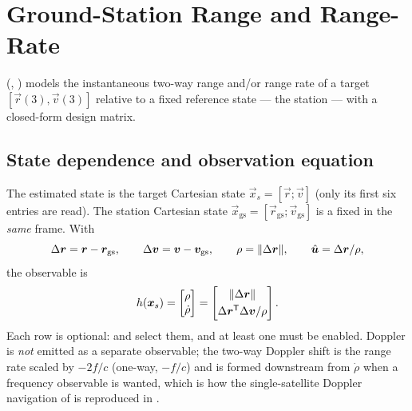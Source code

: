 \section{Ground-Station Range and Range-Rate}
\label{sec:meas-groundrange}

(,
) models the
instantaneous two-way range and/or range rate of a target
$[\vec{r}(3), \vec{v}(3)]$ relative to a fixed reference state --- the station
--- with a closed-form design matrix.

\subsection{State dependence and observation equation}

The estimated state is the target Cartesian state
$\vec{x}_s = [\vec{r}; \vec{v}]$ (only its first six entries are read). The
station Cartesian state
$\vec{x}_\mathrm{gs} = [\vec{r}_\mathrm{gs}; \vec{v}_\mathrm{gs}]$ is a fixed
 in the \emph{same} frame. With
\begin{equation}
  \Delta\bm{r} = \bm{r} - \bm{r}_\mathrm{gs}, \qquad
  \Delta\bm{v} = \bm{v} - \bm{v}_\mathrm{gs}, \qquad
  \rho = \lVert\Delta\bm{r}\rVert, \qquad
  \hat{\bm{u}} = \Delta\bm{r}/\rho,
  \label{eq:meas-gs-defs}
\end{equation}
the observable is
\begin{equation}
  h(\bm{x}_s)
  =
  \begin{bmatrix} \rho \\ \dot{\rho} \end{bmatrix}
  =
  \begin{bmatrix}
    \lVert\Delta\bm{r}\rVert \\[3pt]
    \Delta\bm{r}^{\mathsf{T}}\Delta\bm{v} / \rho
  \end{bmatrix}.
  \label{eq:meas-gs-h}
\end{equation}
Each row is optional:  and  select
them, and at least one must be enabled. Doppler is \emph{not} emitted as a
separate observable; the two-way Doppler shift is the range rate scaled by
$-2f/c$ (one-way, $-f/c$) and is formed downstream from $\dot\rho$ when a
frequency observable is wanted, which is how the single-satellite Doppler
navigation of \citet{coimbra2025endurance} is reproduced in \lupnt{}.


